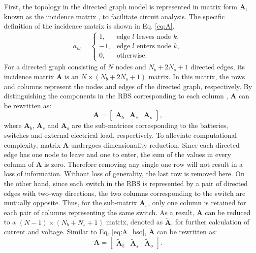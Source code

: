 \documentclass{article}
\begin{document}
First, the topology in the directed graph model is represented in matrix form $\bm{A}$, known as the incidence matrix , to facilitate circuit analysis.
The specific definition of the incidence matrix is shown in Eq. \ref{eq:A}.
\begin{align}\label{eq:A}
    a_{kl}=
    \begin{cases}
        1,  & \text{edge $l$ leaves node $k$},\\
        -1, & \text{edge $l$ enters node $k$},\\
        0,  & \text{otherwise}.
    \end{cases}
\end{align}
For a directed graph consisting of $N$ nodes and $N_b+2N_s+1$ directed edges, its incidence matrix $\bm{A}$ is an $N\times(N_b+2N_s+1)$ matrix. 
In this matrix, the rows and columns represent the nodes and edges of the directed graph, respectively.
By distinguishing the components in the RBS corresponding to each column , $\bm{A}$ can be rewritten as:
\begin{equation}\label{eq:A_bso}
    \bm{A} =
    \begin{bmatrix}
        \bm{A}_b & \bm{A}_s & \bm{A}_o
    \end{bmatrix},
\end{equation}
where $\bm{A}_b$, $\bm{A}_s$ and $\bm{A}_o$ are the sub-matrices corresponding to the batteries, switches and external electrical load, respectively.
To alleviate computational complexity, matrix $\bm{A}$ undergoes dimensionality reduction.
Since each directed edge has one node to leave and one to enter, the sum of the values in every column of $\bm{A}$ is zero.
Therefore removing any single one row will not result in a loss of information. 
Without loss of generality, the last row is removed here.
On the other hand, since each switch in the RBS is represented by a pair of directed edges with two-way directions, the two columns corresponding to the switch are mutually opposite.
Thus, for the sub-matrix $\bm{A}_s$, only one column is retained for each pair of columns representing the same switch.
As a result, $\bm{A}$ can be reduced to a $(N-1)\times(N_b+N_s+1)$ matrix, denoted as $\bm{\tilde{A}}$, for further calculation of current and voltage.
Similar to Eq. \ref{eq:A_bso}, $\bm{\tilde{A}}$ can be rewritten as:
\begin{equation}\label{eq:A_bso_tilde}
    \bm{\tilde{A}} =
    \begin{bmatrix}
        \bm{\tilde{A}}_b & \bm{\tilde{A}}_s & \bm{\tilde{A}}_o
    \end{bmatrix}.
\end{equation}
\end{document}
